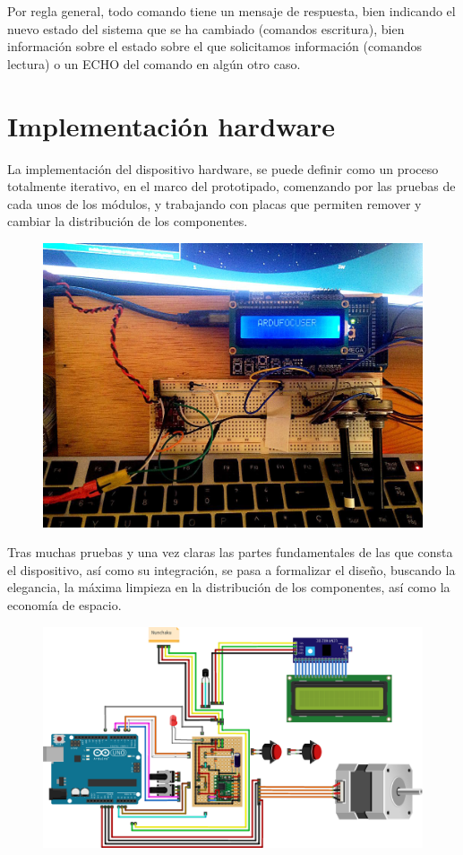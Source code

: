 Por regla general, todo comando tiene un mensaje de respuesta, bien indicando el nuevo estado del sistema que se ha cambiado (comandos escritura), bien información sobre el estado sobre el que solicitamos información (comandos lectura) o un ECHO del comando en algún otro caso.

\newpage
\section{Implementación hardware}

La implementación del dispositivo hardware, se puede definir como un proceso totalmente iterativo, en el marco del prototipado, comenzando por las pruebas de cada unos de los módulos, y trabajando con placas que permiten remover y cambiar la distribución de los componentes.


\begin{figure}[h]
\centering
\includegraphics[width=0.6\linewidth]{../images/prototipoArdufocuser}
\caption{}
\label{fig:prototipoArdufocuser}
\end{figure}

\bigskip
Tras muchas pruebas y una vez claras las partes fundamentales de las que consta el dispositivo, así como su integración, se pasa a formalizar el diseño, buscando la elegancia, la máxima limpieza en la distribución de los componentes, así como la economía de espacio.

\begin{figure}[h]
	\centering
	\includegraphics[width=0.6\linewidth]{../images/circuito}
	\caption{}
	\label{fig:prototipoArdufocuser}
\end{figure}


